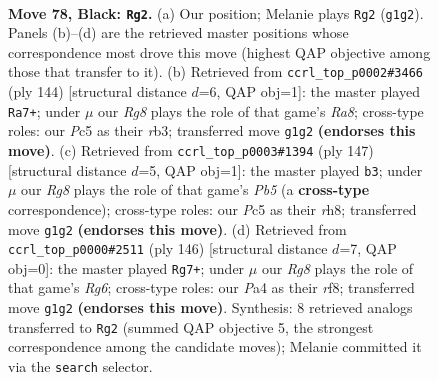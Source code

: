 \documentclass[11pt]{article}
\begin{document}
\clearpage

\begin{figure}[p]\centering
\begin{subfigure}{0.46\textwidth}\centering
\resizebox{\linewidth}{!}{%
\newchessgame
\chessboard[
  setfen={8/4k3/8/2pp4/p4K2/8/8/6r1 b - - 13 78},
  showmover=false,
  pgfstyle=straightmove, color=movearrow, markmove={g1-g2}
]}
\caption{}
\end{subfigure}\hfill
\begin{subfigure}{0.46\textwidth}\centering
\resizebox{\linewidth}{!}{%
\newchessgame
\chessboard[
  setfen={R7/4k3/8/6Pp/8/1r6/8/4K3 w - - 13 73},
  showmover=false,
  pgfstyle=straightmove, color=movearrow, markmove={a8-a7}
]}
\caption{}
\end{subfigure}
\\[4pt]
\begin{subfigure}{0.46\textwidth}\centering
\resizebox{\linewidth}{!}{%
\newchessgame
\chessboard[
  setfen={7R/3k4/8/5p2/1p6/3K4/8/8 b - - 0 74},
  showmover=false,
  pgfstyle=straightmove, color=movearrow, markmove={b4-b3}
]}
\caption{}
\end{subfigure}\hfill
\begin{subfigure}{0.46\textwidth}\centering
\resizebox{\linewidth}{!}{%
\newchessgame
\chessboard[
  setfen={5r2/k7/6R1/p7/8/2P5/K7/8 w - - 1 74},
  showmover=false,
  pgfstyle=straightmove, color=movearrow, markmove={g6-g7}
]}
\caption{}
\end{subfigure}
\caption{\textbf{Move 78, Black: \texttt{Rg2}.} (a) Our position; Melanie plays \texttt{Rg2} (\texttt{g1g2}). Panels (b)--(d) are the retrieved master positions whose correspondence most drove this move (highest QAP objective among those that transfer to it). (b) Retrieved from \texttt{ccrl\_top\_p0002\#3466} (ply 144) [structural distance $d$=6, QAP obj=1]: the master played \texttt{Ra7+}; under $\mu$ our \emph{Rg8} plays the role of that game's \emph{Ra8}; cross-type roles: our \emph{P}c5 as their \emph{r}b3; transferred move \texttt{g1g2} \textbf{(endorses this move)}. (c) Retrieved from \texttt{ccrl\_top\_p0003\#1394} (ply 147) [structural distance $d$=5, QAP obj=1]: the master played \texttt{b3}; under $\mu$ our \emph{Rg8} plays the role of that game's \emph{Pb5} (a \textbf{cross-type} correspondence); cross-type roles: our \emph{P}c5 as their \emph{r}h8; transferred move \texttt{g1g2} \textbf{(endorses this move)}. (d) Retrieved from \texttt{ccrl\_top\_p0000\#2511} (ply 146) [structural distance $d$=7, QAP obj=0]: the master played \texttt{Rg7+}; under $\mu$ our \emph{Rg8} plays the role of that game's \emph{Rg6}; cross-type roles: our \emph{P}a4 as their \emph{r}f8; transferred move \texttt{g1g2} \textbf{(endorses this move)}. Synthesis: 8 retrieved analogs transferred to \texttt{Rg2} (summed QAP objective 5, the strongest correspondence among the candidate moves); Melanie committed it via the \texttt{search} selector.}
\label{fig:thought-m155}
\end{figure}
\end{document}
